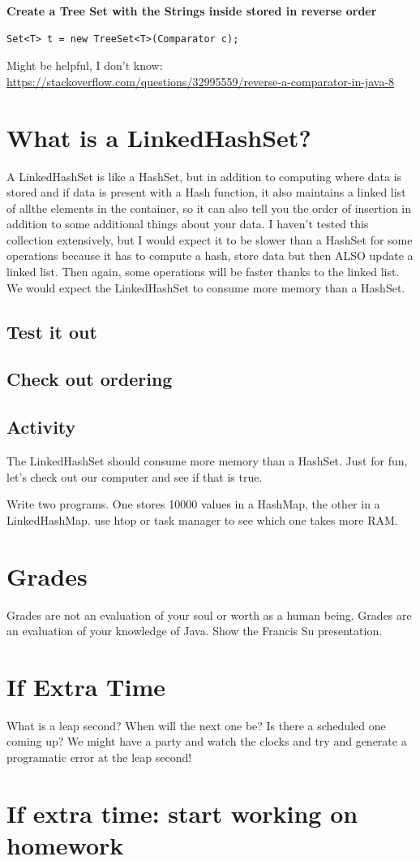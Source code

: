 \documentclass[12pt]{article}
\begin{document}
\textbf{Create a Tree Set with the Strings inside stored in reverse order}

\begin{lstlisting}
Set<T> t = new TreeSet<T>(Comparator c);
\end{lstlisting}

Might be helpful, I don't know:
\url{https://stackoverflow.com/questions/32995559/reverse-a-comparator-in-java-8}

\section{What is a LinkedHashSet?}
A LinkedHashSet is like a HashSet, but in addition to computing where data is stored and if data is present with a Hash function, it also maintains a linked list of allthe elements in the container, so it can also tell you the order of insertion in addition to some additional things about your data. I haven't tested this collection extensively, but I would expect it to be slower than a HashSet for some operations because it has to compute a hash, store data but then ALSO update a linked list. Then again, some operations will be faster thanks to the linked list. We would expect the LinkedHashSet to consume more memory than a HashSet.

\subsection{Test it out}

\subsection{Check out ordering}

\subsection{Activity}
The LinkedHashSet should consume more memory than a HashSet. Just for fun, let's check out our computer and see if that is true.

Write two programs. One stores 10000 values in a HashMap, the other in a LinkedHashMap. use htop or task manager to see which one takes more RAM.


\section{Grades}
Grades are not an evaluation of your soul or worth as a human being. Grades are an evaluation of your knowledge of Java.  Show the Francis Su presentation.

\section{If Extra Time}
What is a leap second? When will the next one be? Is there a scheduled one coming up? We might have a party and watch the clocks and try and generate a programatic error at the leap second!

\section{If extra time: start working on homework}
\end{document}
